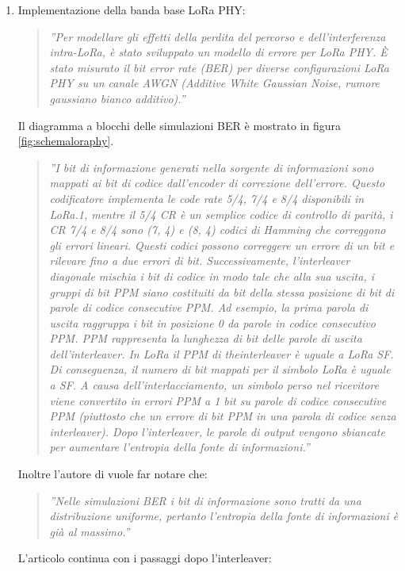 \documentclass[a4paper]{report} %
\begin{document}
\begin{enumerate}
\item Implementazione della banda base LoRa PHY: 
\begin{quote}
	\textit{''Per modellare gli effetti della perdita del percorso e dell'interferenza intra-LoRa, è stato sviluppato un modello di errore per LoRa PHY. È stato misurato il bit error rate (BER) per diverse configurazioni LoRa PHY su un canale AWGN (Additive White Gaussian Noise, rumore gaussiano bianco additivo).''}
\end{quote}
Il diagramma a blocchi delle simulazioni BER è mostrato in figura \ref{fig:schemaloraphy}. 
\begin{quote}
	\textit{''I bit di informazione generati nella sorgente di informazioni sono mappati ai bit di codice dall'encoder di correzione dell'errore. Questo codificatore implementa le code rate 5/4, 7/4 e 8/4 disponibili in LoRa.1, mentre il 5/4 CR è un semplice codice di controllo di parità, i CR 7/4 e 8/4 sono (7, 4) e (8, 4) codici di Hamming che correggono gli errori lineari. Questi codici possono correggere un errore di un bit e rilevare fino a due errori di bit. Successivamente, l'interleaver diagonale mischia i bit di codice in modo tale che alla sua uscita, i gruppi di bit PPM siano costituiti da bit della stessa posizione di bit di parole di codice consecutive PPM. Ad esempio, la prima parola di uscita raggruppa i bit in posizione 0 da parole in codice consecutivo PPM. PPM rappresenta la lunghezza di bit delle parole di uscita dell'interleaver. In LoRa il PPM di theinterleaver è uguale a LoRa SF. Di conseguenza, il numero di bit mappati per il simbolo LoRa è uguale a SF. A causa dell'interlacciamento, un simbolo perso nel ricevitore viene convertito in errori PPM a 1 bit su parole di codice consecutive PPM (piuttosto che un errore di bit PPM in una parola di codice senza interleaver). Dopo l'interleaver, le parole di output vengono sbiancate per aumentare l'entropia della fonte di informazioni.''}
\end{quote}
Inoltre l'autore di \cite{art:rif.49} vuole far notare che:
\begin{quote}
	\textit{''Nelle simulazioni BER i bit di informazione sono tratti da una distribuzione uniforme, pertanto l'entropia della fonte di informazioni è già al massimo.''}
\end{quote}
L'articolo continua con i passaggi dopo l'interleaver:

\end{enumerate}
\end{document}
